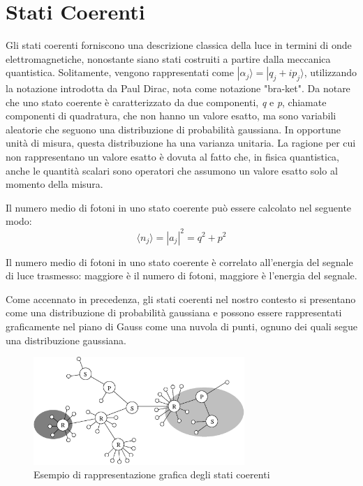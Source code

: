 \section{Stati Coerenti}

Gli stati coerenti forniscono una descrizione classica della luce in termini di onde elettromagnetiche, nonostante siano stati costruiti a partire dalla meccanica quantistica. Solitamente, vengono rappresentati come $|\alpha_j \rangle = |q_j + ip_j \rangle $, utilizzando la notazione introdotta da Paul Dirac, nota come notazione "bra-ket". Da notare che uno stato coerente è caratterizzato da due componenti, \textit{q} e \textit{p}, chiamate componenti di quadratura, che non hanno un valore esatto, ma sono variabili aleatorie che seguono una distribuzione di probabilità gaussiana. In opportune unità di misura, questa distribuzione ha una varianza unitaria. La ragione per cui non rappresentano un valore esatto è dovuta al fatto che, in fisica quantistica, anche le quantità scalari sono operatori che assumono un valore esatto solo al momento della misura.

Il numero medio di fotoni in uno stato coerente può essere calcolato nel seguente modo:
\begin{equation}
\langle n_j \rangle = |a_j|^2 = q^2 + p^2
\end{equation}

Il numero medio di fotoni in uno stato coerente è correlato all'energia del segnale di luce trasmesso: maggiore è il numero di fotoni, maggiore è l'energia del segnale.

Come accennato in precedenza, gli stati coerenti nel nostro contesto si presentano come una distribuzione di probabilità gaussiana e possono essere rappresentati graficamente nel piano di Gauss come una nuvola di punti, ognuno dei quali segue una distribuzione gaussiana.

\begin{figure}[tbp]
\begin{center}
\includegraphics[width=8cm]{figure/esempio-figura-1.eps}
\end{center}
\caption{Esempio di rappresentazione grafica degli stati coerenti} \label{fig:stato-coerente}
\end{figure}

